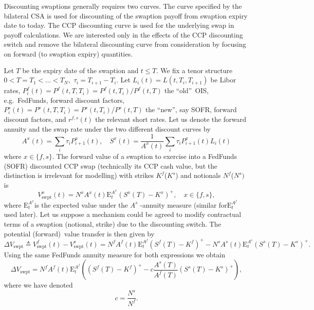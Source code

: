 \documentclass{article}
\begin{document}
Discounting swaptions generally requires two curves. The curve specified by
the bilateral CSA is used for discounting of the swaption payoff from
swaption expiry date to today. The CCP discounting curve is used for the
underlying swap in payoff calculations. We are interested only in the
effects of the CCP discounting switch and remove the bilateral discounting
curve from consideration by focusing on forward (to swaption expiry)
quantities.

Let $T$ be the expiry date of the swaption and $t\leq T.$ We fix a tenor
structure $0<T=T_{1}<\dots <T_{N},$ $\tau _{i}=T_{i+1}-T_{i}$. Let $%
L_{i}(t)=L(t,T_{i},T_{i+1})$ be Libor rates, $%
P_{i}^{f}(t)=P^{f}(t,T,T_{i})=P^{f}(t,T_{i})/P^{f}(t,T)$ the
\textquotedblleft old\textquotedblright\ OIS, e.g.~FedFunds, forward
discount factors, $P_{i}^{s}(t)=P^{s}(t,T,T_{i})=P^{s}(t,T_{i})/P^{s}(t,T)$
the \textquotedblleft new\textquotedblright , say SOFR, forward discount
factors, and $r^{f,s}(t)$ the relevant short rates. Let us denote the
forward annuity and the swap rate under the two different discount curves by%
\begin{equation*}
A^{x}(t)=\sum_{i}\tau _{i}P_{i+1}^{x}(t),\quad S^{x}(t)=\frac{1}{A^{x}(t)}%
\sum_{i}\tau _{i}P_{i+1}^{x}(t)L_{i}(t)
\end{equation*}%
where $x\in \{f,s\}.$ The forward value of a swaption to exercise into a
FedFunds (SOFR) discounted CCP swap (technically its CCP cash value, but the
distinction is irrelevant for modelling) with strikes $K^{f}$($K^{s}$) and
notionals $N^{f}$($N^{s})$ is 
\begin{equation*}
V_{\mathrm{swpt}}^{x}(t)=N^{x}A^{x}(t)\mathrm{E}%
_{t}^{A^{x}}(S^{x}(T)-K^{x})^{+},\quad x\in \{f,s\},
\end{equation*}%
where $\mathrm{E}_{t}^{A^{x}}$is the expected value under the $A^{s}$%
-annuity measure (similar for$\mathrm{E}_{t}^{A^{f}}$ used later). Let us
suppose a mechanism could be agreed to modify contractual terms of a
swaption (notional, strike) due to the discounting switch. The potential
(forward)\ value transfer is then given by 
\begin{equation*}
\Delta V_{\mathrm{swpt}}\triangleq V_{\mathrm{swpt}}^{f}(t)-V_{\mathrm{swpt}%
}^{s}(t)=N^{f}A^{f}(t)\mathrm{E}%
_{t}^{A^{f}}(S^{f}(T)-K^{f})^{+}-N^{s}A^{s}(t)\mathrm{E}%
_{t}^{A^{s}}(S^{s}(T)-K^{s})^{+}.
\end{equation*}%
Using the same FedFunds annuity measure for both expressions we obtain%
\begin{equation*}
\Delta V_{\mathrm{swpt}}=N^{f}A^{f}(t)\mathrm{E}_{t}^{A^{f}}\left(
(S^{f}(T)-K^{f})^{+}-c\frac{A^{s}(T)}{A^{f}(T)}\left( S^{s}(T)-K^{s}\right)
^{+}\right) ,
\end{equation*}%
where we have denoted%
\begin{equation}
c=\frac{N^{s}}{N^{f}}.  \label{eq:swpt1}
\end{equation}
\end{document}
